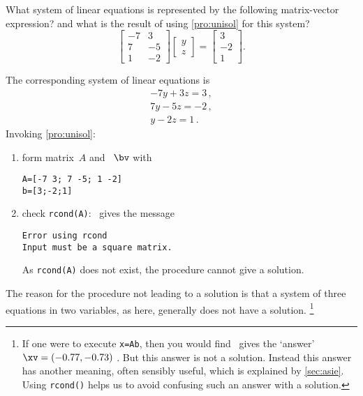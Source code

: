 \begin{example} 
What system of linear equations is represented by the following matrix-vector expression?  and what is the result of using \cref{pro:unisol} for this system?
\begin{equation*}
\begin{bmatrix} -7&3\\ 7&-5\\1&-2 \end{bmatrix}
\begin{bmatrix} y\\z \end{bmatrix}
=\begin{bmatrix} 3\\-2\\1 \end{bmatrix}.
\end{equation*}

\begin{solution} 
The corresponding system of linear equations is
\begin{equation*}
\begin{array}{l}
-7y+3z=3\,,\\7y-5z=-2\,,\\y-2z=1\,.
\end{array}
\end{equation*}
Invoking \cref{pro:unisol}:
\begin{enumerate}
\item form matrix~\(A\) and ~\(\bv\) with
\begin{verbatim}
A=[-7 3; 7 -5; 1 -2]
b=[3;-2;1]
\end{verbatim}
\setbox\ajrqrbox\hbox{}%
\marginajrbox%

\item check \verb|rcond(A)|: \script\ gives the message%
%
%
\begin{verbatim}
Error using rcond
Input must be a square matrix. 
\end{verbatim}
As \verb|rcond(A)| does not exist, the procedure cannot give a solution.
\end{enumerate}
The reason for the procedure not leading to a solution is that a system of three equations in two variables, as here, generally does not have a solution.
\footnote{If one were to execute \texttt{x=A\slosh b}, then you would find \script\ gives the `answer' \(\xv=(-0.77,-0.73)\) \twodp.
But this answer is not a solution.
Instead this answer has another meaning, often sensibly useful, which is explained by \cref{sec:asie}.
Using \texttt{rcond()} helps us to avoid confusing such an answer with a solution.}
\end{solution}
\end{example}




